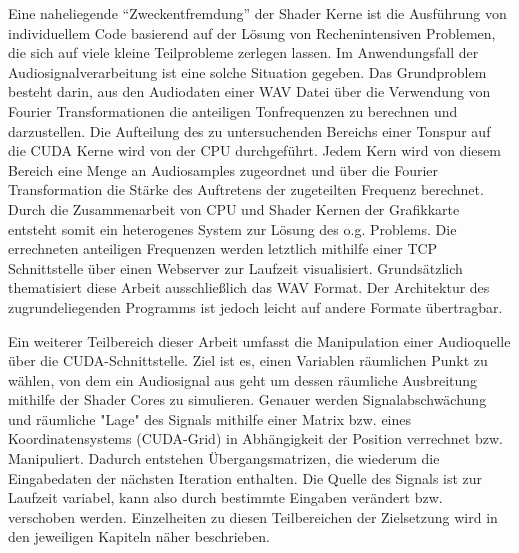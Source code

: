 Eine naheliegende \enquote{Zweckentfremdung} der Shader Kerne ist die Ausführung von individuellem Code basierend auf der Lösung von Rechenintensiven Problemen, die sich auf viele kleine Teilprobleme zerlegen lassen. Im Anwendungsfall der Audiosignalverarbeitung ist eine solche Situation gegeben. Das Grundproblem besteht darin, aus den Audiodaten einer WAV Datei über die Verwendung von Fourier Transformationen die anteiligen Tonfrequenzen zu berechnen und darzustellen. Die Aufteilung des zu untersuchenden Bereichs einer Tonspur auf die CUDA Kerne wird von der CPU durchgeführt. Jedem Kern wird von diesem Bereich eine Menge an Audiosamples zugeordnet und über die Fourier Transformation die Stärke des Auftretens der zugeteilten Frequenz berechnet. Durch die Zusammenarbeit von CPU und Shader Kernen der Grafikkarte entsteht somit ein heterogenes System zur Lösung des o.g. Problems. 
Die errechneten anteiligen Frequenzen werden letztlich mithilfe einer TCP Schnittstelle über einen Webserver zur Laufzeit visualisiert. Grundsätzlich thematisiert diese Arbeit ausschließlich das WAV Format. Der Architektur des zugrundeliegenden Programms ist jedoch leicht auf andere Formate übertragbar.


Ein weiterer Teilbereich dieser Arbeit umfasst die Manipulation einer Audioquelle über die CUDA-Schnittstelle.
Ziel ist es, einen Variablen räumlichen Punkt zu wählen, von dem ein Audiosignal aus geht um dessen räumliche Ausbreitung mithilfe der Shader Cores zu simulieren. Genauer werden Signalabschwächung und räumliche "Lage" des Signals mithilfe einer Matrix bzw. eines Koordinatensystems (CUDA-Grid) in Abhängigkeit der Position verrechnet bzw. Manipuliert. Dadurch entstehen Übergangsmatrizen, die wiederum die Eingabedaten der nächsten Iteration enthalten.
Die Quelle des Signals ist zur Laufzeit variabel, kann also durch bestimmte Eingaben verändert bzw. verschoben werden.
Einzelheiten zu diesen Teilbereichen der Zielsetzung wird in den jeweiligen Kapiteln näher beschrieben.